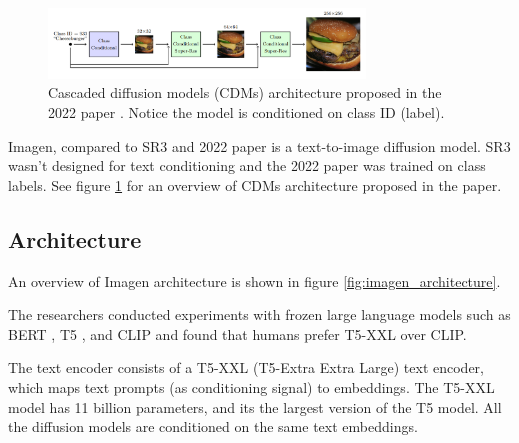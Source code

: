 \begin{figure}
    \centering
    \includegraphics[width=0.75\textwidth]{images/imagen/cdm_architecture.png}
    \caption{Cascaded diffusion models (CDMs) architecture proposed in the 2022 paper \cite{cascaded_diffusion_models}. Notice the model is conditioned on class ID (label).}
    \label{fig:imagen_cdm_architecture}
\end{figure}

Imagen, compared to SR3 \cite{sr3} and 2022 paper \cite{cascaded_diffusion_models} is a text-to-image diffusion model. SR3 wasn't designed for text conditioning and the 2022 paper \cite{cascaded_diffusion_models} was trained on class labels. See figure \ref{fig:imagen_cdm_architecture} for an overview of CDMs architecture proposed in the paper.

































\subsection{Architecture}

An overview of Imagen architecture is shown in figure \ref{fig:imagen_architecture}.

The researchers conducted experiments with frozen large language models such as BERT \cite{bert}, T5 \cite{t5_model}, and CLIP \cite{openai_clip} and found that humans prefer T5-XXL over CLIP.

The text encoder consists of a T5-XXL (T5-Extra Extra Large) text encoder, which maps text prompts (as conditioning signal) to embeddings. The T5-XXL model has 11 billion parameters, and its the largest version of the T5 model. All the diffusion models are conditioned on the same text embeddings.


